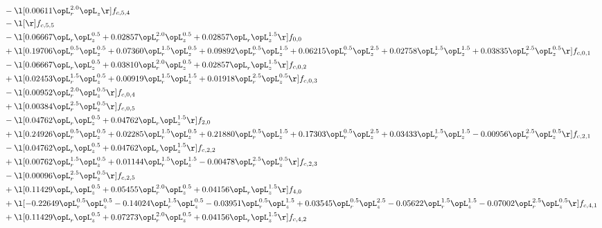 \begin{alignat}{2}
& - \l[  0.00611 \opL_r^{2.0} \opL_z  \r] f_{c,5,4} \nonumber \\ 
& - \l[  \r] f_{c,5,5} \nonumber \\ 
& - \l[  0.06667 \opL_r \opL_z^{0.5} +  0.02857 \opL_r^{2.0} \opL_z^{0.5} +  0.02857 \opL_r \opL_z^{1.5}  \r] f_{0,0} \nonumber \\ 
& + \l[  0.19706 \opL_r^{0.5} \opL_z^{0.5} +  0.07360 \opL_r^{1.5} \opL_z^{0.5} +  0.09892 \opL_r^{0.5} \opL_z^{1.5} +  0.06215 \opL_r^{0.5} \opL_z^{2.5} +  0.02758 \opL_r^{1.5} \opL_z^{1.5} +  0.03835 \opL_r^{2.5} \opL_z^{0.5}  \r] f_{c,0,1} \nonumber \\ 
& - \l[  0.06667 \opL_r \opL_z^{0.5} +  0.03810 \opL_r^{2.0} \opL_z^{0.5} +  0.02857 \opL_r \opL_z^{1.5}  \r] f_{c,0,2} \nonumber \\ 
& + \l[  0.02453 \opL_r^{1.5} \opL_z^{0.5} +  0.00919 \opL_r^{1.5} \opL_z^{1.5} +  0.01918 \opL_r^{2.5} \opL_z^{0.5}  \r] f_{c,0,3} \nonumber \\ 
& - \l[  0.00952 \opL_r^{2.0} \opL_z^{0.5}  \r] f_{c,0,4} \nonumber \\ 
& + \l[  0.00384 \opL_r^{2.5} \opL_z^{0.5}  \r] f_{c,0,5} \nonumber \\ 
& - \l[  0.04762 \opL_r \opL_z^{0.5} +  0.04762 \opL_r \opL_z^{1.5}  \r] f_{2,0} \nonumber \\ 
& + \l[  0.24926 \opL_r^{0.5} \opL_z^{0.5} +  0.02285 \opL_r^{1.5} \opL_z^{0.5} +  0.21880 \opL_r^{0.5} \opL_z^{1.5} +  0.17303 \opL_r^{0.5} \opL_z^{2.5} +  0.03433 \opL_r^{1.5} \opL_z^{1.5}   -0.00956 \opL_r^{2.5} \opL_z^{0.5}  \r] f_{c,2,1} \nonumber \\ 
& - \l[  0.04762 \opL_r \opL_z^{0.5} +  0.04762 \opL_r \opL_z^{1.5}  \r] f_{c,2,2} \nonumber \\ 
& + \l[  0.00762 \opL_r^{1.5} \opL_z^{0.5} +  0.01144 \opL_r^{1.5} \opL_z^{1.5}   -0.00478 \opL_r^{2.5} \opL_z^{0.5}  \r] f_{c,2,3} \nonumber \\ 
& - \l[  0.00096 \opL_r^{2.5} \opL_z^{0.5}  \r] f_{c,2,5} \nonumber \\ 
& + \l[  0.11429 \opL_r \opL_z^{0.5} +  0.05455 \opL_r^{2.0} \opL_z^{0.5} +  0.04156 \opL_r \opL_z^{1.5}  \r] f_{4,0} \nonumber \\ 
& + \l[  -0.22649 \opL_r^{0.5} \opL_z^{0.5}   -0.14024 \opL_r^{1.5} \opL_z^{0.5}   -0.03951 \opL_r^{0.5} \opL_z^{1.5} +  0.03545 \opL_r^{0.5} \opL_z^{2.5}   -0.05622 \opL_r^{1.5} \opL_z^{1.5}   -0.07002 \opL_r^{2.5} \opL_z^{0.5}  \r] f_{c,4,1} \nonumber \\ 
& + \l[  0.11429 \opL_r \opL_z^{0.5} +  0.07273 \opL_r^{2.0} \opL_z^{0.5} +  0.04156 \opL_r \opL_z^{1.5}  \r] f_{c,4,2} \nonumber \\ 

\end{alignat}
